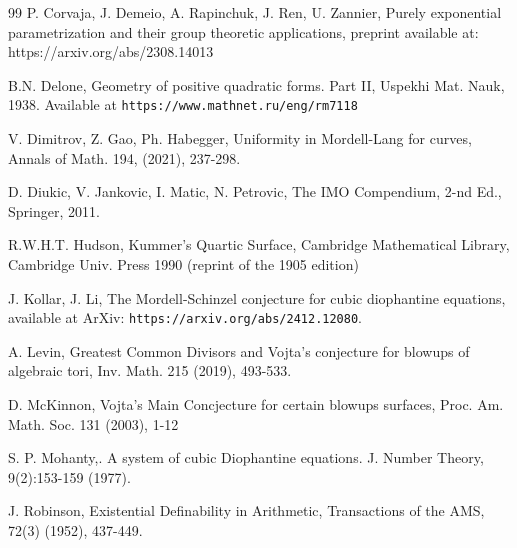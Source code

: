 \documentclass[leqno,12pt]{article} %
\theoremstyle{plain} %
\theoremstyle{definition} %
\begin{document}
\begin{thebibliography}{99}
   P. Corvaja, J. Demeio, A. Rapinchuk, J. Ren, U. Zannier, Purely exponential parametrization and their
group theoretic applications, preprint available at: https://arxiv.org/abs/2308.14013
\smallskip


\smallskip


 
\smallskip

 B.N. Delone, Geometry of positive quadratic forms. Part II, Uspekhi Mat. Nauk, 1938. Available at 
{\tt https://www.mathnet.ru/eng/rm7118} 

\smallskip

  V. Dimitrov, Z. Gao, Ph. Habegger, Uniformity in Mordell-Lang for curves, Annals of Math. 194, (2021), 237-298.
 
 \smallskip

  D. Diukic, V. Jankovic, I. Matic, N. Petrovic, The IMO Compendium,  2-nd Ed., Springer, 2011.

\smallskip


 R.W.H.T. Hudson, Kummer's Quartic Surface, Cambridge Mathematical Library, Cambridge Univ. Press 1990 (reprint of the 1905 edition)
 
\smallskip

 J. Kollar, J. Li, The Mordell-Schinzel conjecture for cubic diophantine equations, available at ArXiv: {\tt https://arxiv.org/abs/2412.12080}.

\smallskip

 A. Levin, Greatest Common Divisors and Vojta's conjecture for blowups of algebraic tori, Inv. Math. 215 (2019), 493-533.

\smallskip

 D. McKinnon, Vojta's Main Concjecture for certain blowups surfaces, Proc. Am. Math. Soc. 131 (2003), 1-12

\smallskip

  S. P. Mohanty,. A system of cubic Diophantine equations. J. Number Theory, 9(2):153-159 (1977). \smallskip



  J. Robinson, Existential Definability in Arithmetic,   Transactions of the AMS, 72(3) (1952), 437-449.\smallskip 


\end{thebibliography}
\end{document}
